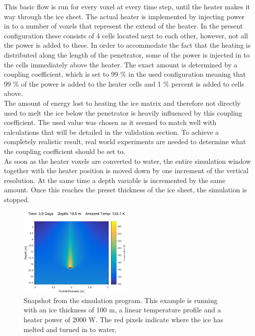 \noindent
This basic flow is run for every voxel at every time step, until the heater makes it way through the ice sheet. The actual heater is implemented by injecting power in to a number of voxels that represent the extend of the heater. In the present configuration these consists of 4 cells located next to each other, however, not all the power is added to these. In order to accommodate the fact that the heating is distributed along the length of the penetrator, some of the power is injected in to the cells immediately above the heater. The exact amount is determined by a coupling coefficient, which is set to 99 \% in the used configuration meaning that 99 \% of the power is added to the heater cells and 1 \% percent is added to cells above. \\

\noindent
The amount of energy lost to heating the ice matrix and therefore not directly used to melt the ice below the penetrator is heavily influenced by this coupling coefficient. The used value was chosen as it seemed to match well with calculations that will be detailed in the validation section. To achieve a completely realistic result, real world experiments are needed to determine what the coupling coefficient should be set to.\\

\noindent
As soon as the heater voxels are converted to water, the entire simulation window together with the heater position is moved down by one increment of the vertical resolution. At the same time a depth variable is incremented by the same amount. Once this reaches the preset thickness of the ice sheet, the simulation is stopped. \\

 \begin{figure}[ht]
 	\centering
 	\includegraphics[width=0.5\textwidth]{figures/LAMC/snapshot.pdf}
 	\caption{Snapshot from the simulation program. This example is running with an ice thickness of 100 m, a linear temperature profile and a heater power of 2000 W. The red pixels indicate where the ice has melted and turned in to water.}
 	\label{fig:simSnapshot}
 \end{figure}

